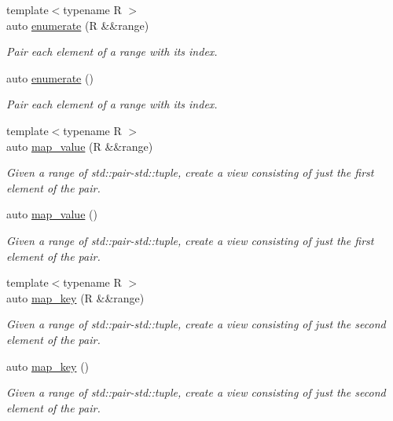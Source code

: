 \begin{DoxyCompactItemize}
{\footnotesize template$<$typename R $>$ }\\auto \mbox{\hyperlink{namespacerah_1_1view_a420160b047554df1bf986946050238ed}{enumerate}} (R \&\&range)
\begin{DoxyCompactList}\small\item\em Pair each element of a range with its index. \end{DoxyCompactList}\item 
auto \mbox{\hyperlink{namespacerah_1_1view_ac815f5494e5a7a182cafb70224b93a6a}{enumerate}} ()
\begin{DoxyCompactList}\small\item\em Pair each element of a range with its index. \end{DoxyCompactList}\item 
{\footnotesize template$<$typename R $>$ }\\auto \mbox{\hyperlink{namespacerah_1_1view_a7896dcebf13a4294254ed87743ba3ad0}{map\+\_\+value}} (R \&\&range)
\begin{DoxyCompactList}\small\item\em Given a range of std\+::pair-\/std\+::tuple, create a view consisting of just the first element of the pair. \end{DoxyCompactList}\item 
auto \mbox{\hyperlink{namespacerah_1_1view_ad11fcca5438e227541594a917a85f77c}{map\+\_\+value}} ()
\begin{DoxyCompactList}\small\item\em Given a range of std\+::pair-\/std\+::tuple, create a view consisting of just the first element of the pair. \end{DoxyCompactList}\item 
{\footnotesize template$<$typename R $>$ }\\auto \mbox{\hyperlink{namespacerah_1_1view_a273917511589d75b32d28b56b7de2655}{map\+\_\+key}} (R \&\&range)
\begin{DoxyCompactList}\small\item\em Given a range of std\+::pair-\/std\+::tuple, create a view consisting of just the second element of the pair. \end{DoxyCompactList}\item 
auto \mbox{\hyperlink{namespacerah_1_1view_aac8d9437b8c96e0e8e972c4c10d584e5}{map\+\_\+key}} ()
\begin{DoxyCompactList}\small\item\em Given a range of std\+::pair-\/std\+::tuple, create a view consisting of just the second element of the pair. \end{DoxyCompactList}\item 

\end{DoxyCompactItemize}
